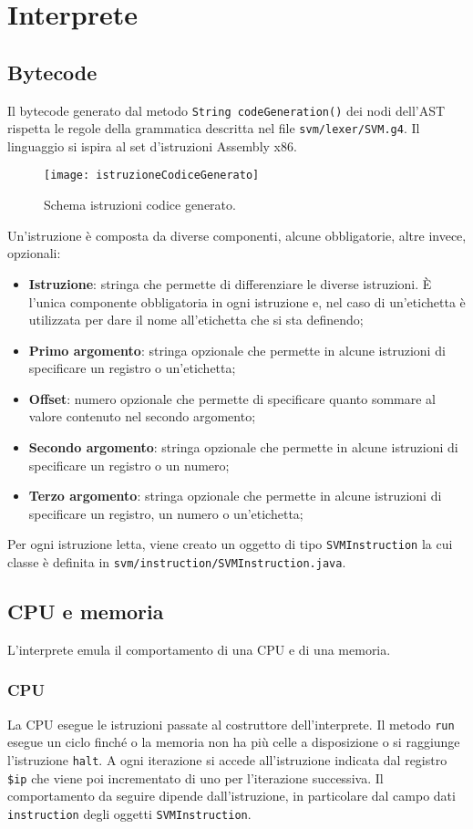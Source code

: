 \documentclass[../report.tex]{subfiles}
\begin{document}
\chapter{Interprete}\label{c:interprete}
\section{Bytecode}\label{s:bytecode}
Il bytecode generato dal metodo \verb|String codeGeneration()| dei nodi dell'AST rispetta le regole della grammatica descritta nel file \verb|svm/lexer/SVM.g4|. Il linguaggio si ispira al set d'istruzioni Assembly x86. 
\begin{figure}[H]
    \centering
    \texttt{[image: istruzioneCodiceGenerato]}
    \caption{Schema istruzioni codice generato.}
    \label{fig:istruzione-codice-generato}
\end{figure}
Un'istruzione \`e composta da diverse componenti, alcune obbligatorie, altre invece, opzionali:
\begin{itemize}
    \item \textbf{Istruzione}: stringa che permette di differenziare le diverse istruzioni. \`E l'unica componente obbligatoria in ogni istruzione e, nel caso di un'etichetta \`e utilizzata per dare il nome all'etichetta che si sta definendo;
    \item \textbf{Primo argomento}: stringa opzionale che permette in alcune istruzioni di specificare un registro o un'etichetta;
    \item \textbf{Offset}: numero opzionale che permette di specificare quanto sommare al valore contenuto nel secondo argomento;
    \item \textbf{Secondo argomento}: stringa opzionale che permette in alcune istruzioni di specificare un registro o un numero;
    \item \textbf{Terzo argomento}: stringa opzionale che permette in alcune istruzioni di specificare un registro, un numero o un'etichetta;
\end{itemize}
Per ogni istruzione letta, viene creato un oggetto di tipo \verb|SVMInstruction| la cui classe \`e definita in \verb|svm/instruction/SVMInstruction.java|.
\section{CPU e memoria}\label{s:cpu-e-memoria}
L'interprete emula il comportamento di una CPU e di una memoria.
\subsection{CPU}
La CPU esegue le istruzioni passate al costruttore dell'interprete. Il metodo \verb|run| esegue un ciclo finch\'e o la memoria non ha pi\`u celle a disposizione o si raggiunge l'istruzione \verb|halt|. A ogni iterazione si accede all'istruzione indicata dal registro \verb|$ip| che viene poi incrementato di uno per l'iterazione successiva. Il comportamento da seguire dipende dall'istruzione, in particolare dal campo dati \verb|instruction| degli oggetti \verb|SVMInstruction|.
\end{document}
